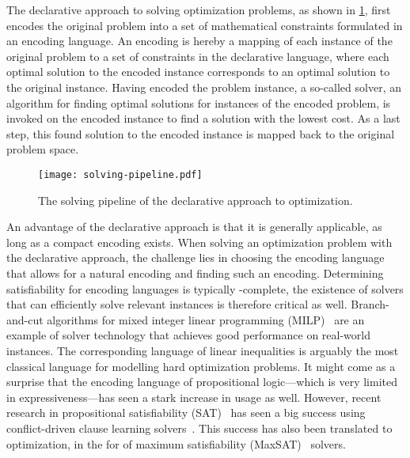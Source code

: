 The declarative approach to solving optimization problems, as shown in \cref{fig:solving-pipeline}, first encodes the original problem into a set of mathematical constraints formulated in an encoding language.
An encoding is hereby a mapping of each instance of the original problem to a set of constraints in the declarative language, where each optimal solution to the encoded instance corresponds to an optimal solution to the original instance.
Having encoded the problem instance, a so-called solver, an algorithm for finding optimal solutions for instances of the encoded problem, is invoked on the encoded instance to find a solution with the lowest cost.
As a last step, this found solution to the encoded instance is mapped back to the original problem space.

\begin{figure}
  \centering
  \texttt{[image: solving-pipeline.pdf]}
  \caption{The solving pipeline of the declarative approach to optimization.}\label{fig:solving-pipeline}
\end{figure}

An advantage of the declarative approach is that it is generally applicable, as long as a compact encoding exists.
When solving an optimization problem with the declarative approach, the challenge lies in choosing the encoding language that allows for a natural encoding and finding such an encoding.
Determining satisfiability for encoding languages is typically \NP-complete, the existence of solvers that can efficiently solve relevant instances is therefore critical as well.
Branch-and-cut algorithms for mixed integer linear programming (MILP)~\autocite{ChenEtAl2010-intro,KorteVygen2018-5} are an example of solver technology that achieves good performance on real-world instances.
The corresponding language of linear inequalities is arguably the most classical language for modelling hard optimization problems.
It might come as a surprise that the encoding language of propositional logic---which is very limited in expressiveness---has seen a stark increase in usage as well.
However, recent  research in propositional satisfiability (SAT)~\autocite{handbook2-sat} has seen a big success using conflict-driven clause learning solvers~\autocite{handbook2-cdcl}.
This success has also been translated to optimization, in the for of maximum satisfiability (MaxSAT)~\autocite{handbook2-maxsat} solvers.

